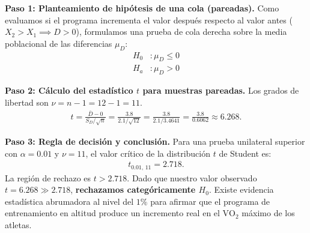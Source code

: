 \begin{solproblema}
	\textbf{Paso 1: Planteamiento de hipótesis de una cola (pareadas).}
	Como evaluamos si el programa incrementa el valor después respecto al valor antes ($X_2 > X_1 \implies D > 0$), formulamos una prueba de cola derecha sobre la media poblacional de las diferencias $\mu_D$:
	\begin{align}
		H_0&: \mu_D \leq 0 \\
		H_a&: \mu_D > 0
	\end{align}
	
	\textbf{Paso 2: Cálculo del estadístico $t$ para muestras pareadas.}
	Los grados de libertad son $\nu = n - 1 = 12 - 1 = 11$.
	\begin{align}
		t = \frac{\bar{D} - 0}{S_D / \sqrt{n}} = \frac{3.8}{2.1 / \sqrt{12}} = \frac{3.8}{2.1 / 3.4641} = \frac{3.8}{0.6062} \approx 6.268.
	\end{align}
	
	\textbf{Paso 3: Regla de decisión y conclusión.}
	Para una prueba unilateral superior con $\alpha = 0.01$ y $\nu = 11$, el valor crítico de la distribución $t$ de Student es:
	\begin{align}
		t_{0.01, \, 11} = 2.718.
	\end{align}
	La región de rechazo es $t > 2.718$. Dado que nuestro valor observado $t = 6.268 \gg 2.718$, \textbf{rechazamos categóricamente $H_0$}. Existe evidencia estadística abrumadora al nivel del $1\%$ para afirmar que el programa de entrenamiento en altitud produce un incremento real en el $\text{VO}_2$ máximo de los atletas.
\end{solproblema}


